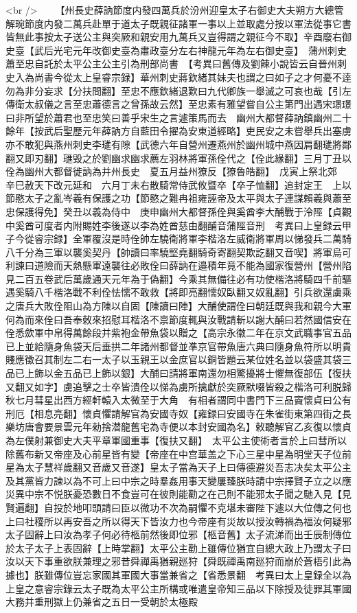 <br />
　　【州長史薛訥節度内發四萬兵於汾州迎皇太子右御史大夫朔方大總管解琬節度内發二萬兵赴單于道太子既親征諸軍一事以上並取處分按以軍法從事它書皆無此事按太子送公主與突厥和親安用九萬兵又豈得謂之親征今不取】辛酉廢右御史臺【武后光宅元年改御史臺為肅政臺分左右神龍元年為左右御史臺】　蒲州刺史蕭至忠自託於太平公主公主引為刑部尚書　【考異曰舊傳及劉餗小說皆云自晉州刺史入為尚書今從太上皇睿宗録】華州刺史蔣欽緒其妹夫也謂之曰如子之才何憂不逹勿為非分妄求【分扶問翻】至忠不應欽緒退歎曰九代卿族一舉滅之可哀也哉【引左傳衛太叔儀之言至忠蕭德言之曾孫故云然】至忠素有雅望嘗自公主第門出遇宋璟璟曰非所望於蕭君也至忠笑曰善乎宋生之言遽策馬而去　幽州大都督薛訥鎮幽州二十餘年【按武后聖歷元年薛訥方自藍田令擢為安東道經略】吏民安之未嘗舉兵出塞虜亦不敢犯與燕州刺史李璡有隙【武德六年自營州遷燕州於幽州城中燕因肩翻璡將鄰翻又即刃翻】璡毁之於劉幽求幽求薦左羽林將軍孫佺代之【佺此緣翻】三月丁丑以佺為幽州大都督徙訥為并州長史　夏五月益州獠反【獠魯皓翻】　戊寅上祭北郊　辛巳赦天下改元延和　六月丁未右散騎常侍武攸暨卒【卒子恤翻】追封定王　上以節愍太子之亂岑羲有保護之功【節愍之難冉祖雍誣帝及太平與太子連謀賴羲與蕭至忠保護得免】癸丑以羲為侍中　庚申幽州大都督孫佺與奚酋李大酺戰于泠陘【貞觀中奚酋可度者内附賜姓李後遂以李為姓酋慈由翻酺音蒲陘音刑　考異曰上皇録云甲子今從睿宗録】全軍覆沒是時佺帥左驍衛將軍李楷洛左威衛將軍周以悌發兵二萬騎八千分為三軍以襲奚契丹【帥讀曰率驍堅堯翻騎奇寄翻契欺訖翻又音喫】將軍烏可利諫曰道險而天熱懸軍遠襲往必敗佺曰薛訥在邉積年竟不能為國家復營州【營州陷見二百五卷武后萬歲通天元年為于偽翻】今乘其無備往必有功使楷洛將騎四千前驅遇奚騎八千楷洛戰不利佺怯懦不敢救【將即亮翻懦奴臥翻又奴亂翻】引兵欲還虜乘之唐兵大敗佺阻山為方陳以自固【陳讀曰陣】大酺使謂佺曰朝廷既與我和親今大軍何為而來佺曰吾奉敇來招慰耳楷洛不禀節度輒與汝戰請斬以謝大酺曰若然國信安在佺悉歛軍中帛得萬餘段并紫袍金帶魚袋以贈之【高宗永徽二年在京文武職事官五品已上並給隨身魚袋天后垂拱二年諸州都督並凖京官帶魚唐六典曰隨身魚符所以明貴賤應徵召其制左二右一太子以玉親王以金庶官以銅皆題云某位姓名並以袋盛其袋三品已上飾以金五品已上飾以銀】大酺曰請將軍南還勿相驚擾將士懼無復部伍【復扶又翻又如字】虜追擊之士卒皆潰佺以悌為虜所擒獻於突厥默啜皆殺之楷洛可利脱歸　秋七月彗星出西方經軒轅入太微至于大角　有相者謂同中書門下三品竇懷貞曰公有刑厄【相息亮翻】懷貞懼請解官為安國寺奴【雍録曰安國寺在朱雀街東第四街之長樂坊唐會要景雲元年勑捨潜龍舊宅為寺便以本封安國為名】敕聽解官乙亥復以懷貞為左僕射兼御史大夫平章軍國重事【復扶又翻】　太平公主使術者言於上曰彗所以除舊布新又帝座及心前星皆有變【帝座在中宫華盖之下心三星中星為明堂天子位前星為太子慧祥歲翻又音歲又音遂】皇太子當為天子上曰傳德避災吾志决矣太平公主及其黨皆力諫以為不可上曰中宗之時羣姦用事天變屢臻朕時請中宗擇賢子立之以應災異中宗不悦朕憂恐數日不食豈可在彼則能勸之在己則不能邪太子聞之馳入見【見賢遍翻】自投於地叩頭請曰臣以微功不次為嗣懼不克堪未審陛下遽以大位傳之何也上曰社稷所以再安吾之所以得天下皆汝力也今帝座有災故以授汝轉禍為福汝何疑邪太子固辭上曰汝為孝子何必待柩前然後即位邪【柩音舊】太子流涕而出壬辰制傳位於太子太子上表固辭【上時掌翻】太平公主勸上雖傳位猶宜自總大政上乃謂太子曰汝以天下事重欲朕兼理之邪昔舜禪禹猶親廵狩【舜既禪禹南廵狩而崩於蒼梧引此為據也】朕雖傳位豈忘家國其軍國大事當兼省之【省悉景翻　考異曰太上皇録全以為上皇之意睿宗錄云太子既為太平公主所構或唯遣皇帝知三品以下除授及徒罪其軍國大務并重刑獄上仍兼省之五日一受朝於太極殿